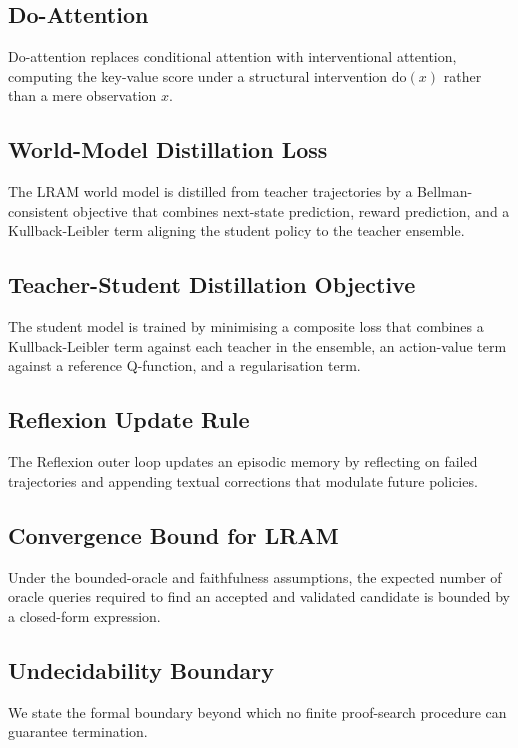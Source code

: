 \subsection{Do-Attention}
Do-attention replaces conditional attention with interventional attention, computing the key-value score under a structural intervention $\mathrm{do}(x)$ rather than a mere observation $x$.


\subsection{World-Model Distillation Loss}
The LRAM world model is distilled from teacher trajectories by a Bellman-consistent objective that combines next-state prediction, reward prediction, and a Kullback-Leibler term aligning the student policy to the teacher ensemble.


\subsection{Teacher-Student Distillation Objective}
The student model is trained by minimising a composite loss that combines a Kullback-Leibler term against each teacher in the ensemble, an action-value term against a reference Q-function, and a regularisation term.


\subsection{Reflexion Update Rule}
The Reflexion outer loop updates an episodic memory by reflecting on failed trajectories and appending textual corrections that modulate future policies.


\subsection{Convergence Bound for LRAM}
Under the bounded-oracle and faithfulness assumptions, the expected number of oracle queries required to find an accepted and validated candidate is bounded by a closed-form expression.


\subsection{Undecidability Boundary}
We state the formal boundary beyond which no finite proof-search procedure can guarantee termination.


